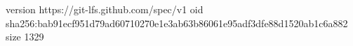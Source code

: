 version https://git-lfs.github.com/spec/v1
oid sha256:bab91ecf951d79ad60710270e1e3ab63b86061e95adf3dfe88d1520ab1c6a882
size 1329
